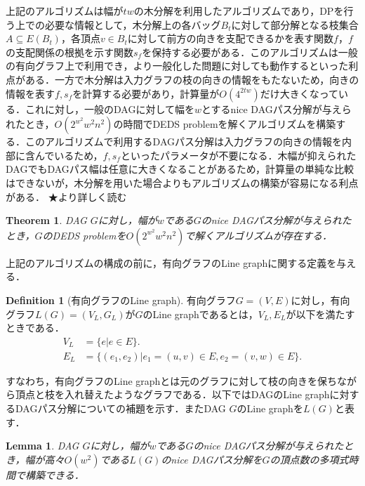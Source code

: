 \documentclass[master]{kuisthesis}		%
\theoremstyle{plain}
\newtheorem{theorem}{Theorem}
\newtheorem{lemma}{Lemma}
\theoremstyle{definition}
\newtheorem{definition*}{Definition}
\begin{document}
上記のアルゴリズムは幅が$tw$の木分解を利用したアルゴリズムであり，DPを行う上での必要な情報として，木分解上の各バッグ$B_t$に対して部分解となる枝集合$A\subseteq E(B_t)$，各頂点$v \in B_t$に対して前方の向きを支配できるかを表す関数$f$，$f$の支配関係の根拠を示す関数$s_f$を保持する必要がある．このアルゴリズムは一般の有向グラフ上で利用でき，より一般化した問題に対しても動作するといった利点がある．一方で木分解は入力グラフの枝の向きの情報をもたないため，向きの情報を表す$f, s_f$を計算する必要があり，計算量が$O(4^{2tw})$だけ大きくなっている．これに対し，一般のDAGに対して幅を$w$とするnice DAGパス分解が与えられたとき，$O(2^{w^2}w^2n^2)$の時間でDEDS problemを解くアルゴリズムを構築する．このアルゴリズムで利用するDAGパス分解は入力グラフの向きの情報を内部に含んでいるため，$f, s_f$といったパラメータが不要になる．木幅が抑えられたDAGでもDAGパス幅は任意に大きくなることがあるため，計算量の単純な比較はできないが，木分解を用いた場合よりもアルゴリズムの構築が容易になる利点がある．
★より詳しく読む

\begin{theorem}\label{DEDS_FPT}
    DAG $G$に対し，幅が$w$である$G$のnice DAGパス分解が与えられたとき，$G$のDEDS problemを$O(2^{w^2}w^2n^2)$で解くアルゴリズムが存在する．
\end{theorem}

上記のアルゴリズムの構成の前に，有向グラフのLine graphに関する定義を与える．

\begin{definition*}[有向グラフのLine graph]
    有向グラフ$G=(V, E)$に対し，有向グラフ$L(G)=(V_L, G_L)$が$G$のLine graphであるとは，$V_L, E_L$が以下を満たすときである．
    \begin{align*}
        V_L &= \{e | e\in E\}.\\
        E_L &= \{(e_1, e_2) | e_1=(u, v)\in E, e_2=(v, w)\in E\}.
    \end{align*}
\end{definition*}

すなわち，有向グラフのLine graphとは元のグラフに対して枝の向きを保ちながら頂点と枝を入れ替えたようなグラフである．以下ではDAGのLine graphに対するDAGパス分解についての補題を示す．またDAG $G$のLine graphを$L(G)$と表す．

\begin{lemma}\label{DAGパス分解(L(G))}
    DAG $G$に対し，幅が$w$である$G$のnice DAGパス分解が与えられたとき，幅が高々$O(w^2)$である$L(G)$のnice DAGパス分解を$G$の頂点数の多項式時間で構築できる．
\end{lemma}
\end{document}
